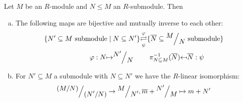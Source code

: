 \documentclass[a4paper]{report}
\begin{document}
\begin{thm}
  Let $M$ be an $R$-module and $N \le M$ an $R$-submodule. Then
  \begin{enumerate}[(a)]
    \item The following maps are bijective and mutually inverse to each other:
          \begin{align*}
            \{N' \subseteq M \text{ submodule} \mid N \subseteq N'\} &{\overunderset \ph \psi \rightleftarrows} \{\bar N \subseteq \fak MN \text{ submodule}\} \\
            \ph: N {\mps} \fak {N'}N \quad & \quad\ \pi_{N \subseteq M}^{-1}(\bar N) {\mpsfrom} \bar N : \psi
          \end{align*}
    \item For $N' \subseteq M$ a submodule with $N \subseteq N'$ we have the $R$-linear isomorphism:
          \[\fak{(M/N)}{(N'/N)} \to \fak M{N'}, \bar m + \fak {N'}M \mps m+N'\]
  \end{enumerate}
\end{thm}
\end{document}
